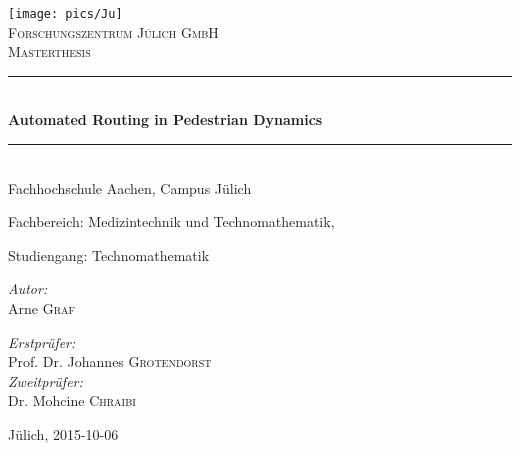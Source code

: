 \begin{titlepage}

\begin{center}

\texttt{[image: pics/Ju]}\\[1cm]    

\textsc{\LARGE Forschungszentrum J{\"u}lich GmbH}\\[1.5cm]

\textsc{\Large Masterthesis}\\[0.5cm]


\newcommand{\HHRule}{\rule{\linewidth}{0.5mm}}
\HHRule \\[0.4cm]
{ \huge \bfseries Automated Routing in Pedestrian Dynamics}\\[0.4cm]
\HHRule \\[1.5cm]

Fachhochschule Aachen, Campus J{\"u}lich

Fachbereich: Medizintechnik und Technomathematik,

Studiengang: Technomathematik

\vfill

\begin{minipage}{0.3\textwidth}
\begin{flushleft} \large
\emph{Autor:}\\
Arne \textsc{Graf}
\end{flushleft}
\end{minipage}
\hfill
\begin{minipage}{0.6\textwidth}
\begin{flushright} \large
\emph{Erstpr{\"u}fer:} \\
Prof. Dr. Johannes \textsc{Grotendorst} \\
\emph{Zweitpr{\"u}fer:} \\
Dr. Mohcine \textsc{Chraibi}
\end{flushright}
\end{minipage}

\vfill

{\large J{\"u}lich, 2015-10-06}

\end{center}

\end{titlepage}